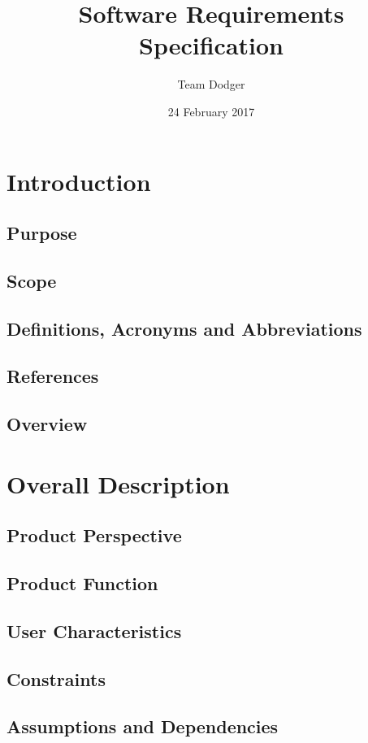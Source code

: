 \documentclass{article}
\title{Software Requirements Specification}
\date{24 February 2017}
\author{Team Dodger}
\begin{document}
	\maketitle
	\newpage
	\tableofcontents
	\newpage
	
	\section{Introduction}
	\subsection{Purpose}
	\subsection{Scope}
	\subsection{Definitions, Acronyms and Abbreviations}
	\subsection{References}
	\subsection{Overview}
	
	\section{Overall Description}
	\subsection{Product Perspective}
	\subsection{Product Function}
	\subsection{User Characteristics}
	\subsection{Constraints}
	\subsection{Assumptions and Dependencies}
	
\end{document}
